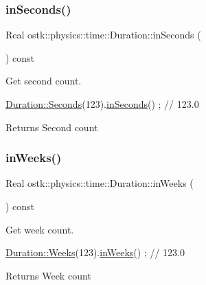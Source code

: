 \subsubsection{\texorpdfstring{in\+Seconds()}{inSeconds()}}
{\footnotesize\ttfamily Real ostk\+::physics\+::time\+::\+Duration\+::in\+Seconds (\begin{DoxyParamCaption}{ }\end{DoxyParamCaption}) const}



Get second count. 


\begin{DoxyCode}
\hyperlink{classostk_1_1physics_1_1time_1_1_duration_ad973fa34fcc308fdcc8d50c3ee694764}{Duration::Seconds}(123).\hyperlink{classostk_1_1physics_1_1time_1_1_duration_ab2062045cd441c3eba4d58773a7bb01b}{inSeconds}() ; \textcolor{comment}{// 123.0}
\end{DoxyCode}


\begin{DoxyReturn}{Returns}
Second count 
\end{DoxyReturn}
\mbox{\label{classostk_1_1physics_1_1time_1_1_duration_a99c5afa0b16e2239cd2cae12454d228d}} 
\subsubsection{\texorpdfstring{in\+Weeks()}{inWeeks()}}
{\footnotesize\ttfamily Real ostk\+::physics\+::time\+::\+Duration\+::in\+Weeks (\begin{DoxyParamCaption}{ }\end{DoxyParamCaption}) const}



Get week count. 


\begin{DoxyCode}
\hyperlink{classostk_1_1physics_1_1time_1_1_duration_a6186e3350364f407e390f520b93dbf83}{Duration::Weeks}(123).\hyperlink{classostk_1_1physics_1_1time_1_1_duration_a99c5afa0b16e2239cd2cae12454d228d}{inWeeks}() ; \textcolor{comment}{// 123.0}
\end{DoxyCode}


\begin{DoxyReturn}{Returns}
Week count 
\end{DoxyReturn}
\mbox{\label{classostk_1_1physics_1_1time_1_1_duration_a4676fb2c4107f121bd197d4475507d40}} 
